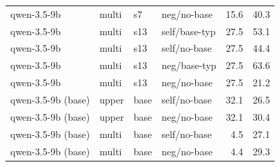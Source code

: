 {\begin{longtable}{llll rr}
qwen-3.5-9b & multi & s7 & neg/no-base & 15.6 & 40.3 \\
qwen-3.5-9b & multi & s13 & self/base-typ & 27.5 & 53.1 \\
qwen-3.5-9b & multi & s13 & self/no-base & 27.5 & 44.4 \\
qwen-3.5-9b & multi & s13 & neg/base-typ & 27.5 & 63.6 \\
qwen-3.5-9b & multi & s13 & neg/no-base & 27.5 & 21.2 \\
\midrule
qwen-3.5-9b (base) & upper & base & self/no-base & 32.1 & 26.5 \\
qwen-3.5-9b (base) & upper & base & neg/no-base & 32.1 & 30.4 \\
\midrule
qwen-3.5-9b (base) & multi & base & self/no-base & 4.5 & 27.1 \\
qwen-3.5-9b (base) & multi & base & neg/no-base & 4.4 & 29.3 \\
\bottomrule
\end{longtable}
}
